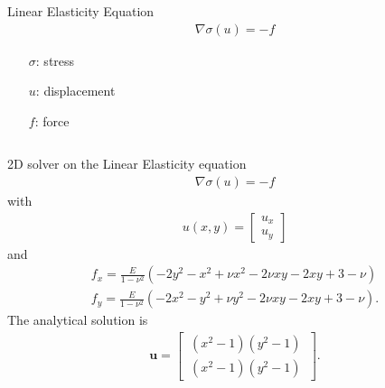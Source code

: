 \documentclass[screen]{beamer}
\begin{document}
\begin{frame}
\begin{columns}
    \begin{column}{\linewidth}
      \begin{block}{Linear Elasticity Equation}
         \begin{align*}
         \nabla \sigma(u) = -f
         \end{align*}
         \begin{itemize}
         \centering
         \item[$\sigma$: ] stress
         \item[$u$: ] displacement
         \item[$f$: ] force
         \item[ ]
         \end{itemize}
      \end{block}
    \end{column}
  \end{columns}
\end{frame}



\begin{frame}
2D solver on the Linear Elasticity equation
\begin{align*}
\nabla \sigma(u) = -f
\end{align*}
\scriptsize
with
\begin{align*}
u(x,y) = 
\begin{bmatrix}
u_x \\
u_y
\end{bmatrix}
\end{align*}
and %
\scriptsize
	\begin{align*}
	f_x = \frac{E}{1-\nu^2} (-2y^2 - x^2 + \nu x^2 - 2\nu xy -2xy + 3 - \nu) \\
	f_y = \frac{E}{1-\nu^2} (-2x^2 - y^2 + \nu y^2 - 2\nu xy -2xy + 3 - \nu). 
	\end{align*}
	The analytical solution is
	\begin{align*}
\bm{u} = \begin{bmatrix}
\, (x^2-1)(y^2-1) \, \\
\, (x^2-1)(y^2-1)
\end{bmatrix}.
\end{align*}
\end{frame}
\end{document}
